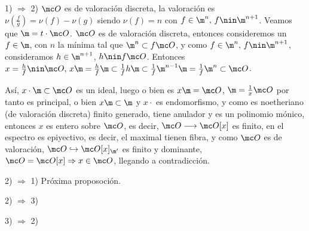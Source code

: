 \begin{dem}
    1) $\Rightarrow$ 2) $\mc O$ es de valoraci\'on discreta, la valoraci\'on es $\nu(\frac{f}{g}) = \nu (f) - \nu (g) $ siendo $\nu(f) = n$ con $f\in \m^n, \, f\nin \m^{n+1}$. Veamos que $\m = t\cdot \mc O$. $\mc O$ es de valoraci\'on discreta, entonces consideremos un $f \in \m$, con $n$ la m\'inima tal que $\m^n \subset f\mc O$, y como $f\in \m^n, \, f\nin \m^{n+1}$, consideramos $h \in \m^{n+1}$, $h \nin f \mc O$. Entonces $x=\frac{h}{f} \nin \mc O, \, x\m  = \frac{h}{f} \m \subset \frac{1}{f}h\m \subset \frac{1}{f} \m^{n-1} \m = \frac{1}{f} \m^n \subset \mc O$. 

    As\'i, $x \cdot \m \subset \mc O$ es un ideal, luego o bien es $x\m =\mc O$, $\m = \frac{1}{x} \mc O$ por tanto es principal, o bien $x\m \subset \m$ y $x\cdot $ es endomorfismo, y como es noetheriano (de valoraci\'on discreta) finito generado, tiene anulador y es un polinomio m\'onico, entonces $x$ es entero sobre $\mc O$, es decir, $\mc O \longrightarrow \mc O[x]$ es finito, en el espectro es epiyectivo, es decir, el maximal tienen fibra, y como $\mc O$ es de valoraci\'on, $\mc O \hookrightarrow \mc O[x]_{\m'}$ es finito y dominante, $\mc O = \mc O[x] \Rightarrow x\in \mc O$, llegando a contradicci\'on. 
    
    2) $\Rightarrow$ 1) Pr\'oxima proposoci\'on. 
    
    2) $\Rightarrow$ 3) 
    
    3) $\Rightarrow$ 2)
\end{dem}

